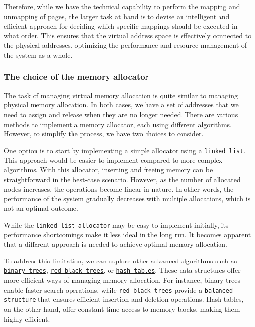 Therefore, while we have the technical capability to perform the mapping and unmapping of pages, the larger task at hand is to devise an intelligent and efficient approach for deciding which specific mappings should be executed in what order. This ensures that the virtual address space is effectively connected to the physical addresses, optimizing the performance and resource management of the system as a whole.

\subsubsection{The choice of the memory allocator}

The task of managing virtual memory allocation is quite similar to managing physical memory allocation. In both cases, we have a set of addresses that we need to assign and release when they are no longer needed. There are various methods to implement a memory allocator, each using different algorithms. However, to simplify the process, we have two choices to consider.

One option is to start by implementing a simple allocator using a \texttt{linked list}. This approach would be easier to implement compared to more complex algorithms. With this allocator, inserting and freeing memory can be straightforward in the best-case scenario. However, as the number of allocated nodes increases, the operations become linear in nature. In other words, the performance of the system gradually decreases with multiple allocations, which is not an optimal outcome.

While the \texttt{linked list allocator} may be easy to implement initially, its performance shortcomings make it less ideal in the long run. It becomes apparent that a different approach is needed to achieve optimal memory allocation.

To address this limitation, we can explore other advanced algorithms such as \href{https://en.wikipedia.org/wiki/Binary_tree}{\texttt{binary trees}}, \href{https://www.cs.auckland.ac.nz/software/AlgAnim/red_black.html}{\texttt{red-black trees}}, or \href{https://en.wikipedia.org/wiki/Hash_table}{\texttt{hash tables}}. These data structures offer more efficient ways of managing memory allocation. For instance, binary trees enable faster search operations, while \texttt{red-black trees} provide a \texttt{balanced structure} that ensures efficient insertion and deletion operations. Hash tables, on the other hand, offer constant-time access to memory blocks, making them highly efficient.

